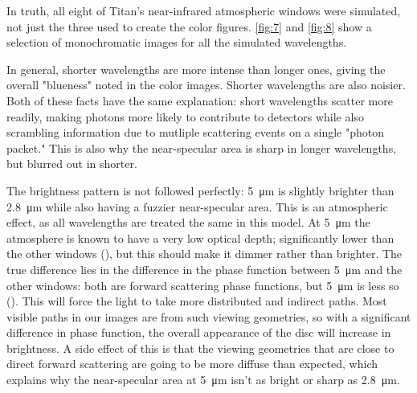 \documentclass{article}
\begin{document}
In truth, all eight of Titan's near-infrared atmospheric windows were simulated, not just the three used to create the color figures. \ref{fig:7} and \ref{fig:8} show a selection of monochromatic images for all the simulated wavelengths. 

In general, shorter wavelengths are more intense than longer ones, giving the overall "blueness" noted in the color images. Shorter wavelengths are also noisier. Both of these facts have the same explanation: short wavelengths scatter more readily, making photons more likely to contribute to detectors while also scrambling information due to mutliple scattering events on a single "photon packet." This is also why the near-specular area is sharp in longer wavelengths, but blurred out in shorter.

The brightness pattern is not followed perfectly: \qty{5}{\micro\meter} is slightly brighter than \qty{2.8}{\micro\meter} while also having a fuzzier near-specular area. This is an atmospheric effect, as all wavelengths are treated the same in this model. At \qty{5}{\micro\meter} the atmosphere is known to have a very low optical depth; significantly lower than the other windows (\cite{EsSayeh2023}), but this should make it dimmer rather than brighter. The true difference lies in the difference in the phase function between \qty{5}{\micro\meter} and the other windows: both are forward scattering phase functions, but \qty{5}{\micro\meter} is less so (\cite{Tomasko2008}). This will force the light to take more distributed and indirect paths. Most visible paths in our images are from such viewing geometries, so with a significant difference in phase function, the overall appearance of the disc will increase in brightness. A side effect of this is that the viewing geometries that are close to direct forward scattering are going to be more diffuse than expected, which explains why the near-specular area at \qty{5}{\micro\meter} isn't as bright or sharp as \qty{2.8}{\micro\meter}. 
\end{document}
